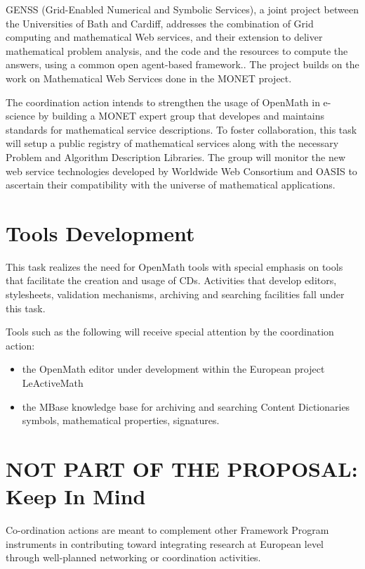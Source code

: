 \documentclass{euproposal}
\begin{document}
GENSS (Grid-Enabled Numerical and Symbolic Services), a joint project
between the Universities of Bath and Cardiff, addresses the
combination of Grid computing and mathematical Web services, and their
extension to deliver mathematical problem analysis, and the code and
the resources to compute the answers, using a common open agent-based
framework.. The project builds on the work on Mathematical Web
Services done in the MONET project.

The coordination action intends to strengthen the usage of OpenMath in
e-science by building a MONET expert group that developes and
maintains standards for mathematical service descriptions. To foster
collaboration, this task will setup a public registry of mathematical
services along with the necessary Problem and Algorithm Description
Libraries.  The group will monitor the new web service technologies
developed by Worldwide Web Consortium and OASIS to ascertain their
compatibility with the universe of mathematical applications.


\section{Tools Development} 
\label{tools}

This task realizes the need for OpenMath tools with special emphasis
on tools that facilitate the creation and usage of CDs. Activities
that develop editors, stylesheets, validation mechanisms, archiving
and searching facilities fall under this task.

Tools such as the following will receive special attention by the
coordination action: 
\begin{itemize}
\item the OpenMath editor under development within the European
  project LeActiveMath
\item the MBase knowledge base for archiving and searching Content
  Dictionaries symbols, mathematical properties, signatures.


\end{itemize}



\newpage

\section{NOT PART OF THE PROPOSAL:  Keep In Mind}
Co-ordination actions are meant to complement other Framework Program
instruments in contributing toward integrating research at European
level through well-planned networking or coordination activities.
\end{document}
